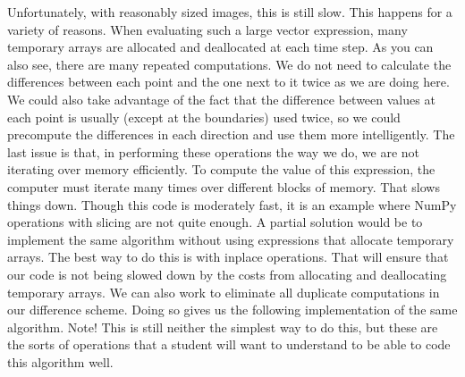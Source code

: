 Unfortunately, with reasonably sized images, this is still slow.
This happens for a variety of reasons.
When evaluating such a large vector expression, many temporary arrays are allocated and deallocated at each time step.
As you can also see, there are many repeated computations.
We do not need to calculate the differences between each point and the one next to it twice as we are doing here.
We could also take advantage of the fact that the difference between values at each point is usually (except at the boundaries) used twice, so we could precompute the differences in each direction and use them more intelligently.
The last issue is that, in performing these operations the way we do, we are not iterating over memory efficiently.
To compute the value of this expression, the computer must iterate many times over different blocks of memory.
That slows things down.
Though this code is moderately fast, it is an example where NumPy operations with slicing are not quite enough.
A partial solution would be to implement the same algorithm without using expressions that allocate temporary arrays.
The best way to do this is with inplace operations.
That will ensure that our code is not being slowed down by the costs from allocating and deallocating temporary arrays.
We can also work to eliminate all duplicate computations in our difference scheme.
Doing so gives us the following implementation of the same algorithm.
Note! This is still neither the simplest way to do this, but these are the sorts of operations that a student will want to understand to be able to code this algorithm well.
